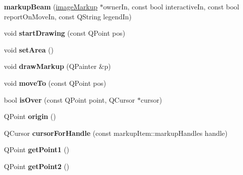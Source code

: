 \begin{DoxyCompactItemize}
\item 
\hypertarget{classmarkupBeam_a7c5abd2cb10de09f7e542bd5bb29299a}{
{\bfseries markupBeam} (\hyperlink{classimageMarkup}{imageMarkup} $\ast$ownerIn, const bool interactiveIn, const bool reportOnMoveIn, const QString legendIn)}
\label{classmarkupBeam_a7c5abd2cb10de09f7e542bd5bb29299a}

\item 
\hypertarget{classmarkupBeam_a241b4191faa7b7588ca4a1398dce83c9}{
void {\bfseries startDrawing} (const QPoint pos)}
\label{classmarkupBeam_a241b4191faa7b7588ca4a1398dce83c9}

\item 
\hypertarget{classmarkupBeam_a426527b6dd3e3113e8a54402c658af9c}{
void {\bfseries setArea} ()}
\label{classmarkupBeam_a426527b6dd3e3113e8a54402c658af9c}

\item 
\hypertarget{classmarkupBeam_a1c9f4a8b96899963faafd20b12845197}{
void {\bfseries drawMarkup} (QPainter \&p)}
\label{classmarkupBeam_a1c9f4a8b96899963faafd20b12845197}

\item 
\hypertarget{classmarkupBeam_aeb3470b326dfe0ca0808f5a7390cf34a}{
void {\bfseries moveTo} (const QPoint pos)}
\label{classmarkupBeam_aeb3470b326dfe0ca0808f5a7390cf34a}

\item 
\hypertarget{classmarkupBeam_a0662cddefb83705e6c14b0870d19b647}{
bool {\bfseries isOver} (const QPoint point, QCursor $\ast$cursor)}
\label{classmarkupBeam_a0662cddefb83705e6c14b0870d19b647}

\item 
\hypertarget{classmarkupBeam_a2c3a6045feb0f3093101951e5c938c8b}{
QPoint {\bfseries origin} ()}
\label{classmarkupBeam_a2c3a6045feb0f3093101951e5c938c8b}

\item 
\hypertarget{classmarkupBeam_a80c28e0af84ad0a21d4069bc9acbe5de}{
QCursor {\bfseries cursorForHandle} (const markupItem::markupHandles handle)}
\label{classmarkupBeam_a80c28e0af84ad0a21d4069bc9acbe5de}

\item 
\hypertarget{classmarkupBeam_af4dbb501db97fc2b21c8f49eba26ec7a}{
QPoint {\bfseries getPoint1} ()}
\label{classmarkupBeam_af4dbb501db97fc2b21c8f49eba26ec7a}

\item 
\hypertarget{classmarkupBeam_a0c3580dc369e3c3fa38845e0962ede7d}{
QPoint {\bfseries getPoint2} ()}
\label{classmarkupBeam_a0c3580dc369e3c3fa38845e0962ede7d}


\end{DoxyCompactItemize}
